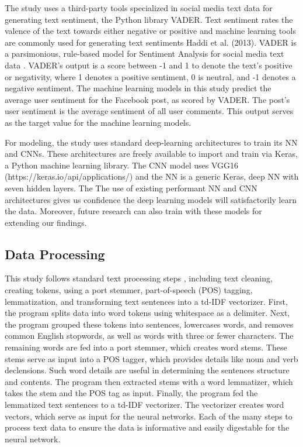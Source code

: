 \documentclass[mksc,blindrev]{informs3} %
\begin{document}
The study uses a third-party tools specialized in social media text data for generating text sentiment, the Python library VADER. Text sentiment rates the valence of the text towards either negative or positive and machine learning tools are commonly used for generating text sentiments Haddi et al. (2013). VADER is a parsimonious, rule-based model for Sentiment Analysis for social media text data \cite{Gilbert}. VADER’s output is a score between -1 and 1 to denote the text’s positive or negativity, where 1 denotes a positive sentiment, 0 is neutral, and -1 denotes a negative sentiment. The machine learning models in this study predict the average user sentiment for the Facebook post, as scored by VADER. The post’s user sentiment is the average sentiment of all user comments. This output serves as the target value for the machine learning models.

For modeling, the study uses standard deep-learning architectures to train its NN and CNNs. These architectures are freely available to import and train via Keras, a Python machine learning library. The CNN model uses VGG16 (https://keras.io/api/applications/) and the NN is a generic Keras, deep NN with seven hidden layers. The The use of existing performant NN and CNN architectures gives us confidence the deep learning models will satisfactorily learn the data. Moreover, future research can also train with these models for extending our findings.

\subsection{Data Processing}

This study follows standard text processing steps \cite{Camacho-Collados2019}, including text cleaning, creating tokens, using a port stemmer, part-of-speech (POS) tagging, lemmatization, and transforming text sentences into a td-IDF vectorizer. First, the program splits data into word tokens using whitespace as a delimiter. Next, the program grouped these tokens into sentences, lowercases words, and removes common English stopwords, as well as words with three or fewer characters. The remaining words are fed into a port stemmer, which creates word stems. These stems serve as input into a POS tagger, which provides details like noun and verb declensions. Such word details are useful in determining the sentences structure and contents. The program then extracted stems with a word lemmatizer, which takes the stem and the POS tag as input. Finally, the program fed the lemmatized text sentences to a td-IDF vectorizer. The vectorizer creates word vectors, which serve as input for the neural networks. Each of the many steps to process text data to ensure the data is informative and easily digestable for the neural network.
\end{document}
